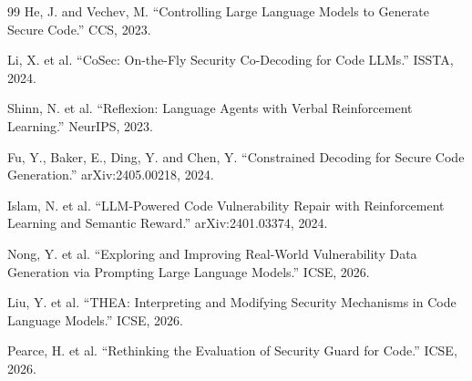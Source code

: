 \documentclass[sigconf,10pt]{acmart}
\begin{document}
\begin{thebibliography}{99}
He, J. and Vechev, M. ``Controlling Large Language Models to Generate Secure Code.'' CCS, 2023.

Li, X. et al. ``CoSec: On-the-Fly Security Co-Decoding for Code LLMs.'' ISSTA, 2024.

Shinn, N. et al. ``Reflexion: Language Agents with Verbal Reinforcement Learning.'' NeurIPS, 2023.

Fu, Y., Baker, E., Ding, Y. and Chen, Y. ``Constrained Decoding for Secure Code Generation.'' arXiv:2405.00218, 2024.

Islam, N. et al. ``LLM-Powered Code Vulnerability Repair with Reinforcement Learning and Semantic Reward.'' arXiv:2401.03374, 2024.

Nong, Y. et al. ``Exploring and Improving Real-World Vulnerability Data Generation via Prompting Large Language Models.'' ICSE, 2026.

Liu, Y. et al. ``THEA: Interpreting and Modifying Security Mechanisms in Code Language Models.'' ICSE, 2026.

Pearce, H. et al. ``Rethinking the Evaluation of Security Guard for Code.'' ICSE, 2026.

\end{thebibliography}
\end{document}
